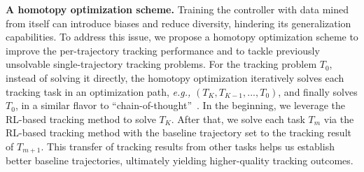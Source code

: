 
\noindent\textbf{A homotopy optimization scheme.}
Training the controller with data mined from itself can introduce biases and reduce diversity, hindering its generalization capabilities. To address this issue, we propose a homotopy optimization scheme to improve the per-trajectory tracking performance and to tackle previously unsolvable single-trajectory tracking problems. For the tracking problem $T_0$, instead of solving it directly, the homotopy optimization iteratively solves each tracking task in an optimization path, \emph{e.g.,} $(T_K, T_{K-1}, ..., T_0)$, and finally solves $T_0$, in a similar flavor to ``chain-of-thought''~\citep{Wei2022ChainOT}. In the beginning, we leverage the RL-based tracking method to solve $T_K$. After that, we solve each task $T_m$ via the RL-based tracking method with the baseline trajectory set to the tracking result of $T_{m+1}$. This transfer of tracking results from other tasks helps us establish better baseline trajectories, ultimately yielding higher-quality tracking outcomes.


